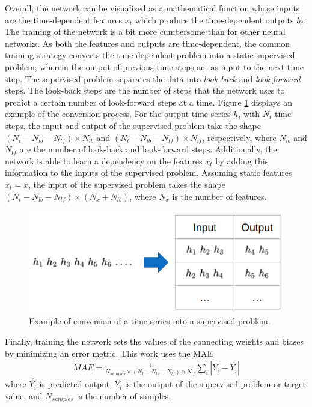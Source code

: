 Overall, the network can be visualized as a mathematical function whose inputs are the time-dependent features $x_t$ which produce the time-dependent outputs $h_t$.
The training of the network is a bit more cumbersome than for other neural networks.
As both the features and outputs are time-dependent, the common training strategy converts the time-dependent problem into a static supervised problem, wherein the output of previous time steps act as input to the next time step.
The supervised problem separates the data into \textit{look-back} and \textit{look-forward} steps.
The look-back steps are the number of steps that the network uses to predict a certain number of look-forward steps at a time.
Figure \ref{fig:lstm-convert} displays an example of the conversion process.
For the output time-series $h$, with $N_t$ time steps, the input and output of the supervised problem take the shape $(N_t-N_{lb}-N_{lf}) \times N_{lb}$ and $(N_t-N_{lb}-N_{lf}) \times N_{lf}$, respectively, where $N_{lb}$ and $N_{lf}$ are the number of look-back and look-forward steps.
Additionally, the network is able to learn a dependency on the features $x_t$ by adding this information to the inputs of the supervised problem.
Assuming static features $x_t = x$, the input of the supervised problem takes the shape $(N_t-N_{lb}-N_{lf}) \times (N_x + N_{lb})$, where $N_x$ is the number of features.

\begin{figure}[htbp!] %
  \centering
  \includegraphics[width=0.50\linewidth]{figures/lstm_convert}
  \hfill
  \caption{Example of conversion of a time-series into a supervised problem.}
  \label{fig:lstm-convert}
\end{figure}

Finally, training the network sets the values of the connecting weights and biases by minimizing an error metric.
This work uses the \gls*{MAE}
\begin{align}
MAE = \frac{1}{N_{samples} \times (N_t-N_{lb}-N_{lf}) \times N_{lf}} \sum_i | Y_i - \hat{Y_i} | \label{eq-MAE}
\end{align}
where $\hat{Y_i}$ is predicted output, $Y_i$ is the output of the supervised problem or target value, and $N_{samples}$ is the number of samples.


